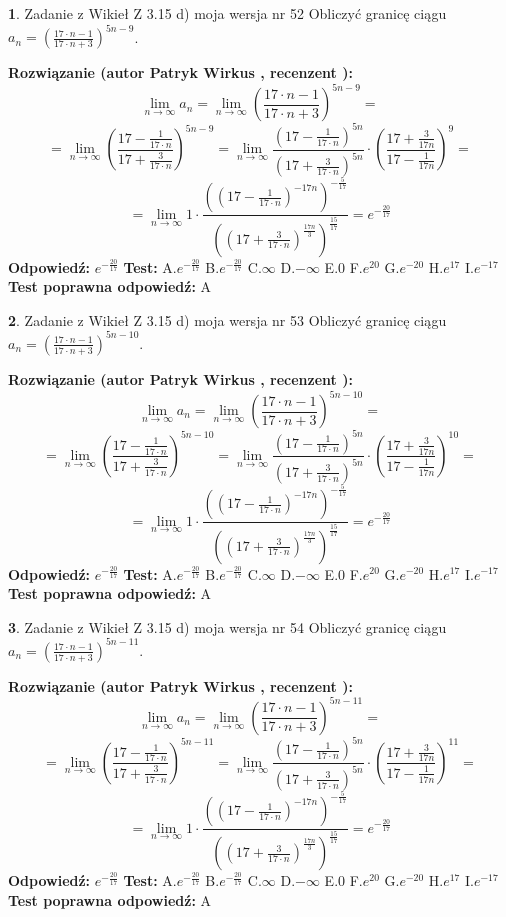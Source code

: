 \documentclass[12pt, a4paper]{article}
\theoremstyle{definition} %
\newtheorem{zad}{}
\newcommand{\zadStart}[1]{\begin{zad}#1\newline}
\newcommand{\zadStop}{\end{zad}}
\newcommand{\rozwStart}[2]{\noindent \textbf{Rozwiązanie (autor #1 , recenzent #2): }\newline}
\newcommand{\rozwStop}{\newline}
\newcommand{\odpStart}{\noindent \textbf{Odpowiedź:}\newline}
\newcommand{\odpStop}{\newline}
\newcommand{\testStart}{\noindent \textbf{Test:}\newline}
\newcommand{\testStop}{\newline}
\newcommand{\kluczStart}{\noindent \textbf{Test poprawna odpowiedź:}\newline}
\newcommand{\kluczStop}{\newline}
\begin{document}
\zadStart{Zadanie z Wikieł Z 3.15 d) moja wersja nr 52}
Obliczyć granicę ciągu $a_{n}=(\frac{17\cdot n - 1}{17 \cdot n + 3})^{5n-9}$.
\zadStop
\rozwStart{Patryk Wirkus}{}
$$\lim\limits_{n\to\infty} a_{n} = \lim\limits_{n\to\infty}(\frac{17\cdot n - 1}{17 \cdot n + 3})^{5n-9}=$$
$$=\lim\limits_{n\to\infty}(\frac{17 - \frac{1}{17\cdot n}}{17 + \frac{3}{17 \cdot n}})^{5n-9}=\lim\limits_{n\to\infty}\frac{(17 - \frac{1}{17\cdot n})^{5n}}{(17 + \frac{3}{17\cdot n})^{5n}} \cdot (\frac{17+\frac{3}{17n}}{17-\frac{1}{17n}})^{9}=$$
$$=\lim\limits_{n\to\infty} 1 \cdot \frac{((17-\frac{1}{17 \cdot n})^{-17n})^{-\frac{5}{17}}}{((17+\frac{3}{17 \cdot n})^{\frac{17n}{3}})^{\frac{15}{17}}} =e^{-\frac{20}{17}}$$
\rozwStop
\odpStart
$e^{-\frac{20}{17}}$
\odpStop
\testStart
A.$ e^{-\frac{20}{17}}$
B.$ e^{-\frac{20}{17}}$
C.$\infty$
D.$-\infty$
E.$0$
F.$e^{20}$
G.$e^{-20}$
H.$e^{17}$
I.$e^{-17}$
\testStop
\kluczStart
A
\kluczStop



\zadStart{Zadanie z Wikieł Z 3.15 d) moja wersja nr 53}
Obliczyć granicę ciągu $a_{n}=(\frac{17\cdot n - 1}{17 \cdot n + 3})^{5n-10}$.
\zadStop
\rozwStart{Patryk Wirkus}{}
$$\lim\limits_{n\to\infty} a_{n} = \lim\limits_{n\to\infty}(\frac{17\cdot n - 1}{17 \cdot n + 3})^{5n-10}=$$
$$=\lim\limits_{n\to\infty}(\frac{17 - \frac{1}{17\cdot n}}{17 + \frac{3}{17 \cdot n}})^{5n-10}=\lim\limits_{n\to\infty}\frac{(17 - \frac{1}{17\cdot n})^{5n}}{(17 + \frac{3}{17\cdot n})^{5n}} \cdot (\frac{17+\frac{3}{17n}}{17-\frac{1}{17n}})^{10}=$$
$$=\lim\limits_{n\to\infty} 1 \cdot \frac{((17-\frac{1}{17 \cdot n})^{-17n})^{-\frac{5}{17}}}{((17+\frac{3}{17 \cdot n})^{\frac{17n}{3}})^{\frac{15}{17}}} =e^{-\frac{20}{17}}$$
\rozwStop
\odpStart
$e^{-\frac{20}{17}}$
\odpStop
\testStart
A.$ e^{-\frac{20}{17}}$
B.$ e^{-\frac{20}{17}}$
C.$\infty$
D.$-\infty$
E.$0$
F.$e^{20}$
G.$e^{-20}$
H.$e^{17}$
I.$e^{-17}$
\testStop
\kluczStart
A
\kluczStop



\zadStart{Zadanie z Wikieł Z 3.15 d) moja wersja nr 54}
Obliczyć granicę ciągu $a_{n}=(\frac{17\cdot n - 1}{17 \cdot n + 3})^{5n-11}$.
\zadStop
\rozwStart{Patryk Wirkus}{}
$$\lim\limits_{n\to\infty} a_{n} = \lim\limits_{n\to\infty}(\frac{17\cdot n - 1}{17 \cdot n + 3})^{5n-11}=$$
$$=\lim\limits_{n\to\infty}(\frac{17 - \frac{1}{17\cdot n}}{17 + \frac{3}{17 \cdot n}})^{5n-11}=\lim\limits_{n\to\infty}\frac{(17 - \frac{1}{17\cdot n})^{5n}}{(17 + \frac{3}{17\cdot n})^{5n}} \cdot (\frac{17+\frac{3}{17n}}{17-\frac{1}{17n}})^{11}=$$
$$=\lim\limits_{n\to\infty} 1 \cdot \frac{((17-\frac{1}{17 \cdot n})^{-17n})^{-\frac{5}{17}}}{((17+\frac{3}{17 \cdot n})^{\frac{17n}{3}})^{\frac{15}{17}}} =e^{-\frac{20}{17}}$$
\rozwStop
\odpStart
$e^{-\frac{20}{17}}$
\odpStop
\testStart
A.$ e^{-\frac{20}{17}}$
B.$ e^{-\frac{20}{17}}$
C.$\infty$
D.$-\infty$
E.$0$
F.$e^{20}$
G.$e^{-20}$
H.$e^{17}$
I.$e^{-17}$
\testStop
\kluczStart
A
\kluczStop
\end{document}
